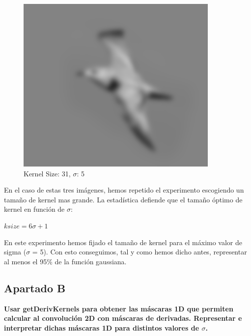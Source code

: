 \documentclass{article}
\begin{document}
\begin{minipage}{\linewidth}
    \begin{minipage}{0.45\linewidth}
        \begin{figure}[H]
            \includegraphics[width=\linewidth]{Ejercicio1a/gaussiana(31,31)5.png}
            \caption{Kernel Size: 31, $\sigma$: 5}
        \end{figure}
    \end{minipage}    
\end{minipage}
\linebreak
En el caso de estas tres imágenes, hemos repetido el experimento escogiendo un tamaño de kernel mas grande. La estadística defiende que el tamaño óptimo de kernel en función de $\sigma$:

\begin{center}
$ksize = 6 \sigma + 1$
\end{center}

En este experimento hemos fijado el tamaño de kernel para el máximo valor de sigma ($\sigma$ = 5). Con esto conseguimos, tal y como hemos dicho antes, representar al menos el 95\% de la función gaussiana.

\subsection*{Apartado B}
\textbf{Usar getDerivKernels para obtener las máscaras 1D que permiten calcular al convolución 2D con máscaras de derivadas. Representar e interpretar dichas máscaras 1D para distintos valores de $\sigma$.}
\end{document}
